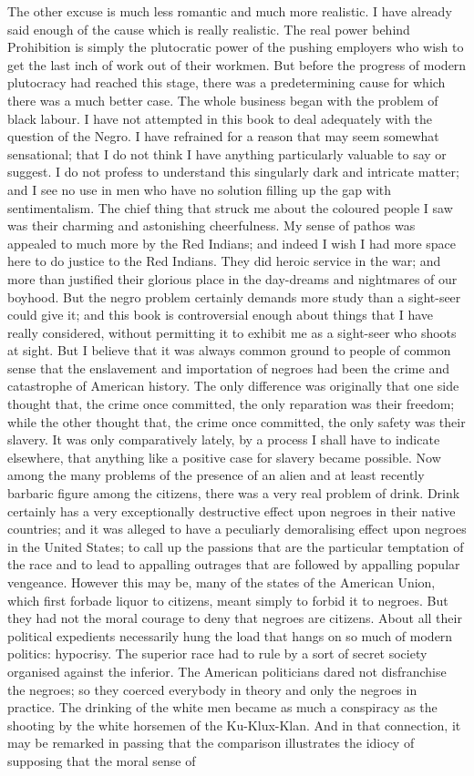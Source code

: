 \documentclass{book}
\begin{document}
The other excuse is much less romantic and much more realistic. I have already said enough of the cause which is really realistic. The real power behind Prohibition is simply the plutocratic power of the pushing employers who wish to get the last inch of work out of their workmen. But before the progress of modern plutocracy had reached this stage, there was a predetermining cause for which there was a much better case. The whole business began with the problem of black labour. I have not attempted in this book to deal adequately with the question of the Negro. I have refrained for a reason that may seem somewhat sensational; that I do not think I have anything particularly valuable to say or suggest. I do not profess to understand this singularly dark and intricate matter; and I see no use in men who have no solution filling up the gap with sentimentalism. The chief thing that struck me about the coloured people I saw was their charming and astonishing cheerfulness. My sense of pathos was appealed to much more by the Red Indians; and indeed I wish I had more space here to do justice to the Red Indians. They did heroic service in the war; and more than justified their glorious place in the day-dreams and nightmares of our boyhood. But the negro problem certainly demands more study than a sight-seer could give it; and this book is controversial enough about things that I have really considered, without permitting it to exhibit me as a sight-seer who shoots at sight. But I believe that it was always common ground to people of common sense that the enslavement and importation of negroes had been the crime and catastrophe of American history. The only difference was originally that one side thought that, the crime once committed, the only reparation was their freedom; while the other thought that, the crime once committed, the only safety was their slavery. It was only comparatively lately, by a process I shall have to indicate elsewhere, that anything like a positive case for slavery became possible. Now among the many problems of the presence of an alien and at least recently barbaric figure among the citizens, there was a very real problem of drink. Drink certainly has a very exceptionally destructive effect upon negroes in their native countries; and it was alleged to have a peculiarly demoralising effect upon negroes in the United States; to call up the passions that are the particular temptation of the race and to lead to appalling outrages that are followed by appalling popular vengeance. However this may be, many of the states of the American Union, which first forbade liquor to citizens, meant simply to forbid it to negroes. But they had not the moral courage to deny that negroes are citizens. About all their political expedients necessarily hung the load that hangs on so much of modern politics: hypocrisy. The superior race had to rule by a sort of secret society organised against the inferior. The American politicians dared not disfranchise the negroes; so they coerced everybody in theory and only the negroes in practice. The drinking of the white men became as much a conspiracy as the shooting by the white horsemen of the Ku-Klux-Klan. And in that connection, it may be remarked in passing that the comparison illustrates the idiocy of supposing that the moral sense of 
\end{document}
